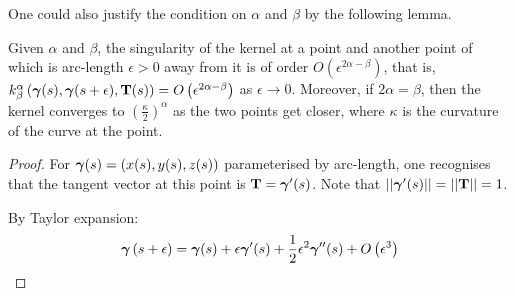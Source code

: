 \documentclass[../dissertation.tex]{subfiles}
\begin{document}
One could also justify the condition on $\alpha$ and $\beta$ by the following lemma.
\begin{lemma}
    Given $\alpha$ and $\beta$, the singularity of the kernel at a point and another point of which is arc-length $\epsilon > 0$ away from it is of order $O \left( \epsilon^{2\alpha - \beta} \right)$, that is, $k_{\beta}^{\alpha} \left( \boldsymbol{\gamma}(s), \boldsymbol{\gamma}(s+\epsilon), \mathbf{T}(s) \right) = O \left( \epsilon^{2\alpha-\beta} \right)$ as $\epsilon \rightarrow 0$. Moreover, if $2\alpha = \beta$, then the kernel converges to $\left( \frac{\kappa}{2} \right)^{\alpha}$ as the two points get closer, where $\kappa$ is the curvature of the curve at the point.
    \begin{proof}
        For $\boldsymbol{\gamma} (s) = \left( x(s), y(s), z(s) \right)$ parameterised by arc-length, one recognises that the tangent vector at this point is $\mathbf{T} = \boldsymbol{\gamma}'(s)$.
        Note that $\lvert \lvert \boldsymbol{\gamma}'(s) \rvert \rvert=\lvert \lvert \mathbf{T} \rvert \rvert = 1$.

        By Taylor expansion:
        \begin{equation}
            \boldsymbol{\gamma} \left( s + \epsilon \right) = \boldsymbol{\gamma} (s) + \epsilon \boldsymbol{\gamma}'(s) + \frac{1}{2} \epsilon^2 \boldsymbol{\gamma}''(s) + O \left( \epsilon^3 \right)
        \end{equation}


\end{proof}
\end{lemma}
\end{document}
